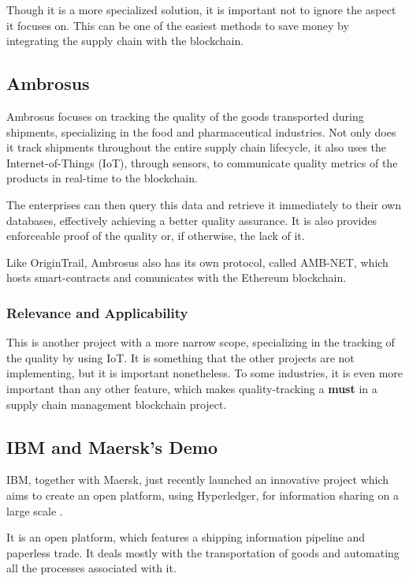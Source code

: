 Though it is a more specialized solution, it is important not to ignore the aspect it focuses on. This can be one of the easiest methods to save money by integrating the supply chain with the blockchain.


\subsection{Ambrosus}
Ambrosus focuses on tracking the quality of the goods transported during shipments, specializing in the food and pharmaceutical industries. Not only does it track shipments throughout the entire supply chain lifecycle, it also uses the Internet-of-Things (IoT), through sensors, to communicate quality metrics of the products in real-time to the blockchain. 

The enterprises can then query this data and retrieve it immediately to their own databases, effectively achieving a better quality assurance. It is also provides enforceable proof of the quality or, if otherwise, the lack of it.

Like OriginTrail, Ambrosus also has its own protocol, called AMB-NET, which hosts smart-contracts and comunicates with the Ethereum blockchain.

\subsubsection{Relevance and Applicability}
This is another project with a more narrow scope, specializing in the tracking of the quality by using IoT. It is something that the other projects are not implementing, but it is important nonetheless. To some industries, it is even more important than any other feature, which makes quality-tracking a \textbf{must} in a supply chain management blockchain project.


\subsection{IBM and Maersk's Demo}
IBM, together with Maersk, just recently launched an innovative project which aims to create an open platform, using Hyperledger, for information sharing on a large scale \cite{A.P.MOLLER-MAERSK}.

It is an open platform, which features a shipping information pipeline and paperless trade. It deals mostly with the transportation of goods and automating all the processes associated with it. 

